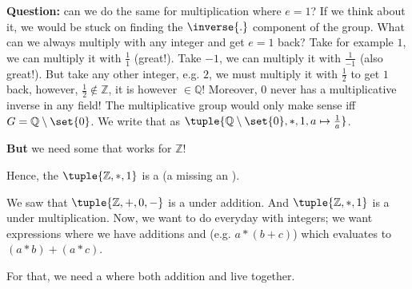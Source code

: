 \textbf{Question: }can we do the same for multiplication where $e = 1$? If we think about it, we would be stuck on finding the $\inverse{.}$ component of the group. What can we always multiply with any integer and get $e=1$ back? Take for example $1$, we can multiply it with $\frac{1}{1}$ (great!). Take $-1$, we can multiply it with $\frac{1}{-1}$ (also great!). But take any other integer, e.g. $2$, we must multiply it with $\frac{1}{2}$ to get $1$ back, however, $\frac{1}{2} \notin \mathbb{Z}$, it is however $\in \mathbb{Q}$! Moreover, $0$ never has a multiplicative inverse in any field! The multiplicative group would only make sense iff $G = \mathbb{Q} \setminus \set{0}$. We write that as $\tuple{\mathbb{Q} \setminus \set{0}, * , 1, a \mapsto \frac{1}{a}}$.

\textbf{But }we need some   that works for $\mathbb{Z}$!


Hence, the  $\tuple{\mathbb{Z}, * , 1}$ is a  (a  missing an ).


We saw that $\tuple{\mathbb{Z}, +, 0, -}$ is a  under addition. And $\tuple{\mathbb{Z}, *, 1}$ is a  under multiplication. Now, we want to do everyday  with integers; we want expressions where we have additions and  (e.g. $a * (b + c)$) which evaluates to $(a * b) + (a * c)$.

For that, we need a  where both addition and  live together.

